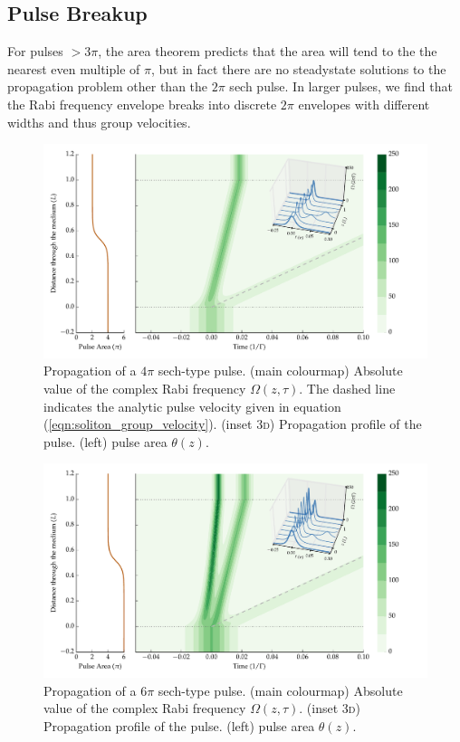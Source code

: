   \subsection{Pulse Breakup} 

    For pulses $>3 \pi$, the area theorem predicts that the area will tend to
    the the nearest even multiple of $\pi$, but in fact there are no steadystate
    solutions to the propagation problem other than the $2\pi$ sech
    pulse\cite{Matulic1972}. In larger pulses, we find that the Rabi frequency
    envelope breaks into discrete $2\pi$ envelopes with different widths and
    thus group velocities\cite{Lamb1971}.

    \begin{figure}[]
      \includegraphics[width=\linewidth]
        {figs/03_nonlinear/coh_sech_4_0pi_fwhm0_020_Ng01000_fig5.pdf}
      \caption{
      Propagation of a $4 \pi$ sech-type pulse. (main colourmap) Absolute value
      of the complex Rabi frequency $\Omega(z, \tau)$. The dashed line indicates
      the analytic pulse velocity given in equation
      (\ref{eqn:soliton_group_velocity}). (inset \textsc{3d}) Propagation
      profile of the pulse. (left) pulse area $\theta(z)$.
      }
      \label{fig:sit_4pi}
    \end{figure}

    \begin{figure}[]
      \includegraphics[width=\linewidth]
        {figs/03_nonlinear/coh_sech_6_0pi_fwhm0_020_Ng01000_fig6.pdf}
      \caption{
      Propagation of a $6 \pi$ sech-type pulse. (main colourmap) Absolute value
      of the complex Rabi frequency $\Omega(z, \tau)$. (inset \textsc{3d})
      Propagation profile of the pulse. (left) pulse area $\theta(z)$.
      }
      \label{fig:sit_6pi}
    \end{figure}

